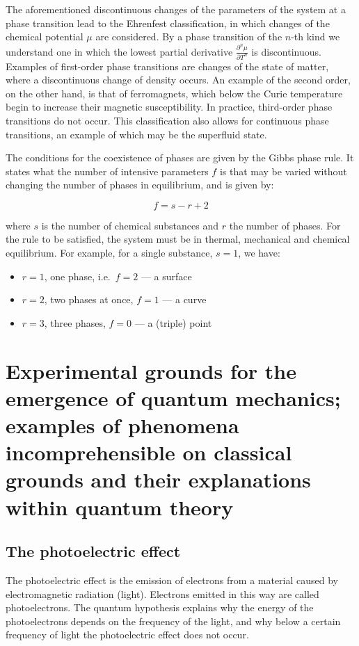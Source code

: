 The aforementioned discontinuous changes of the parameters of the system at a phase transition lead to the Ehrenfest classification, in which changes of the chemical potential $\mu$ are considered. By a phase transition of the $n$-th kind we understand one in which the lowest partial derivative $\frac{\partial^n \mu}{\partial T^n}$ is discontinuous. Examples of first-order phase transitions are changes of the state of matter, where a discontinuous change of density occurs. An example of the second order, on the other hand, is that of ferromagnets, which below the Curie temperature begin to increase their magnetic susceptibility. In practice, third-order phase transitions do not occur. This classification also allows for continuous phase transitions, an example of which may be the superfluid state.

The conditions for the coexistence of phases are given by the Gibbs phase rule. It states what the number of intensive parameters $f$ is that may be varied without changing the number of phases in equilibrium, and is given by:

\[ f = s - r + 2 \]

where $s$ is the number of chemical substances and $r$ the number of phases. For the rule to be satisfied, the system must be in thermal, mechanical and chemical equilibrium. For example, for a single substance, $s=1$, we have:

\begin{itemize}
    \item $r=1$, one phase, i.e.\ $f=2$ --- a surface
    \item $r=2$, two phases at once, $f=1$ --- a curve
    \item $r=3$, three phases, $f=0$ --- a (triple) point
\end{itemize}

\section{Experimental grounds for the emergence of quantum mechanics; examples of phenomena incomprehensible on classical grounds and their explanations within quantum theory}

\subsection{The photoelectric effect}

The photoelectric effect is the emission of electrons from a material caused by electromagnetic radiation (light). Electrons emitted in this way are called photoelectrons. The quantum hypothesis explains why the energy of the photoelectrons depends on the frequency of the light, and why below a certain frequency of light the photoelectric effect does not occur.

